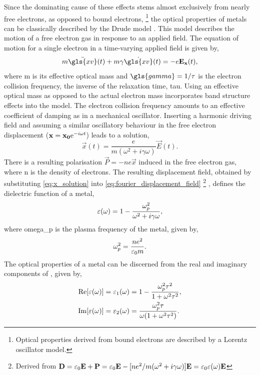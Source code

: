 \documentclass{article}
\begin{document}
Since the dominating cause of these effects stems almost exclusively from nearly free electrons, as opposed to bound electrons,%
\footnote{Optical properties derived from bound electrons are described by a Lorentz oscillator model.}
the optical properties of metals can be classically described by the Drude model \cite{drude1900}. This model describes the motion of a free electron gas in response to an applied field. The equation of motion for a single electron in a time-varying applied field is given by,
\begin{equation}
	m\ddot{\gls{xv}}(t) + m\gamma \dot{\gls{xv}}(t) = -e\vec{E_x}(t),
\end{equation}
where \gls{m} is its effective optical mass and $\gls{gamma} = 1/\tau$ is the electron collision frequency, the inverse of the relaxation time, \gls{tau}. Using an effective optical mass as opposed to the actual electron mass incorporates band structure effects into the model. The electron collision frequency amounts to an effective coefficient of damping as in a mechanical oscillator. Inserting a harmonic driving field and assuming a similar oscillatory behaviour in the free electron displacement ($\vec{x} = \vec{x_0}\e^{-i\omega t}$) leads to a solution,
\begin{equation}
	\vec{x}(t) = \frac{e}{m(\omega^2 + i\gamma\omega)}\vec{E}(t).
	\label{eq:x_solution}
\end{equation}
There is a resulting polarisation $\vec{P}=-ne\vec{x}$ induced in the free electron gas, where \gls{n} is the density of electrons. The resulting displacement field, obtained by substituting \eqref{eq:x_solution} into \eqref{eq:fourier_displacement_field}%
\footnote{Derived from $\vec{D}=\epsfs\vec{E} + \vec{P} = \epsfs\vec{E} - [ne^2/m(\omega^2 + i\gamma\omega)]\vec{E} = \epsfs\eps(\omega)\vec{E}$}
, defines the dielectric function of a metal,
\begin{equation}
	\eps(\omega) = 1 - \frac{\omegap[2]}{\omega^2 + i\gamma\omega},
\end{equation}
where \gls{omega_p} is the plasma frequency of the metal, given by,
\begin{equation}
	\omegap[2] = \frac{ne^2}{\varepsilon_0 m}.
	\label{eq:plasma_frequency}
\end{equation}
The optical properties of a metal can be discerned from the real and imaginary components of \dielectric, given by,
\begin{subequations}
	\begin{align}
	\real{\dielectric} = \eps_1(\omega) &= 1 - \frac{\omegap[2]\tau^2}{1+\omega^2\tau^2},\\
	\imag{\dielectric} = \eps_2(\omega) &= \frac{\omegap[2]\tau}{\omega(1+\omega^2\tau^2)}.
	\end{align}
\end{subequations}
\end{document}
